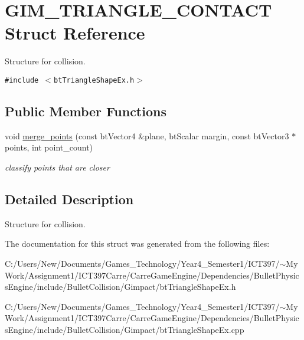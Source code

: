 \hypertarget{struct_g_i_m___t_r_i_a_n_g_l_e___c_o_n_t_a_c_t}{
\section{GIM\_\-TRIANGLE\_\-CONTACT Struct Reference}
\label{struct_g_i_m___t_r_i_a_n_g_l_e___c_o_n_t_a_c_t}
}
Structure for collision.  


{\tt \#include $<$btTriangleShapeEx.h$>$}

\subsection*{Public Member Functions}
\begin{CompactItemize}
\item 
\hypertarget{struct_g_i_m___t_r_i_a_n_g_l_e___c_o_n_t_a_c_t_c506be6f6fe6cb2f37b2890669f69266}{
void \hyperlink{struct_g_i_m___t_r_i_a_n_g_l_e___c_o_n_t_a_c_t_c506be6f6fe6cb2f37b2890669f69266}{merge\_\-points} (const btVector4 \&plane, btScalar margin, const btVector3 $\ast$points, int point\_\-count)}
\label{struct_g_i_m___t_r_i_a_n_g_l_e___c_o_n_t_a_c_t_c506be6f6fe6cb2f37b2890669f69266}

\begin{CompactList}\small\item\em classify points that are closer \item\end{CompactList}\end{CompactItemize}


\subsection{Detailed Description}
Structure for collision. 

The documentation for this struct was generated from the following files:\begin{CompactItemize}
\item 
C:/Users/New/Documents/Games\_\-Technology/Year4\_\-Semester1/ICT397/$\sim$My Work/Assignment1/ICT397Carre/CarreGameEngine/Dependencies/BulletPhysicsEngine/include/BulletCollision/Gimpact/btTriangleShapeEx.h\item 
C:/Users/New/Documents/Games\_\-Technology/Year4\_\-Semester1/ICT397/$\sim$My Work/Assignment1/ICT397Carre/CarreGameEngine/Dependencies/BulletPhysicsEngine/include/BulletCollision/Gimpact/btTriangleShapeEx.cpp\end{CompactItemize}

